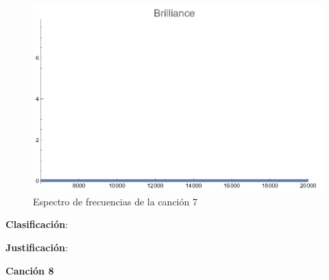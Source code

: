 \documentclass[12pt, letterpaper]{article}
\begin{document}
\begin{figure}[H]
\begin{minipage}{.3\textwidth}
  \end{minipage}
  \begin{minipage}{0.03\textwidth}\end{minipage}
  \begin{minipage}{.3\textwidth}
    \centering
    \includegraphics[width=.9\linewidth]{imgs/Cancion7/brilliance.png}
  \end{minipage}
  \caption{Espectro de frecuencias de la canción 7}
  \label{fig:esp07}
\end{figure}

\textbf{Clasificación}: 

\textbf{Justificación}: 

\newpage

\textbf{\large{Canción 8}}
\end{document}
